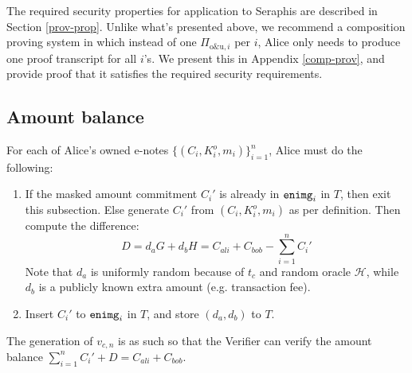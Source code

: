 \documentclass{article}
\begin{document}
The required security properties for application to Seraphis are described in Section \ref{prov-prop}. Unlike what's presented above, we recommend a composition proving system in which instead of one $\Pi_{\text{o\&u}, i}$ per $i$, Alice only needs to produce one proof transcript for all $i$'s. We present this in Appendix \ref{comp-prov}, and provide proof that it satisfies the required security requirements.

\subsection{Amount balance}\label{amt-bal}
For each of Alice's owned e-notes $\{(C_i,K_i^o,m_i)\}_{i=1}^n$, Alice must do the following:
\begin{enumerate}
    \item If the masked amount commitment $C_i'$ is already in ${\tt enimg}_i$ in $T$, then exit this subsection. Else generate $C_i'$ from $(C_i, K_i^o, m_i)$ as per definition. Then compute the difference:
    $$D = d_a G + d_b H = C_{ali}+C_{bob} - \sum_{i=1}^n{C_i'}$$
    Note that $d_a$ is uniformly random because of $t_c$ and random oracle $\mathcal{H}$, while $d_b$ is a publicly known extra amount (e.g. transaction fee).
    \item Insert $C_i'$ to ${\tt enimg}_i$ in $T$, and store $(d_a, d_b)$ to $T$.
\end{enumerate}
The generation of $v_{c,n}$ is as such so that the Verifier can verify the amount balance $\sum_{i=1}^n{C_i'} + D = C_{ali}+C_{bob}$.
\end{document}
